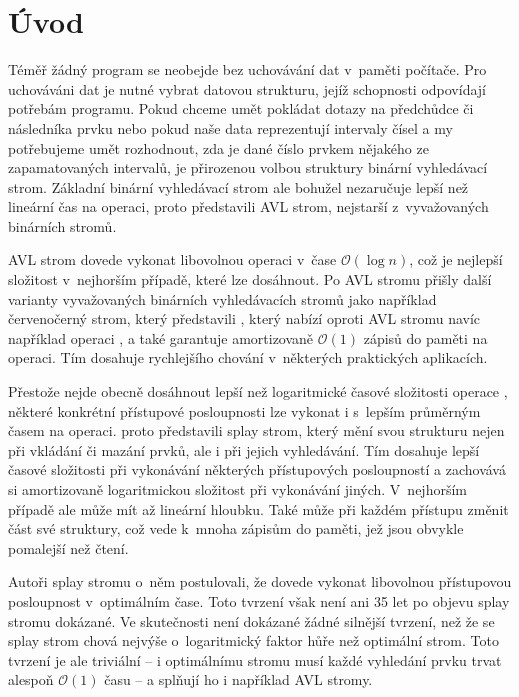 \chapter*{Úvod}

Téměř žádný program se neobejde bez uchovávání dat v~paměti počítače. Pro uchováváni dat je nutné vybrat datovou strukturu, jejíž schopnosti odpovídají potřebám programu. Pokud chceme umět pokládat dotazy na předchůdce či následníka prvku nebo pokud naše data reprezentují intervaly čísel a my potřebujeme umět rozhodnout, zda je dané číslo prvkem nějakého ze zapamatovaných intervalů, je přirozenou volbou struktury binární vyhledávací strom. Základní binární vyhledávací strom ale bohužel nezaručuje lepší než lineární čas na operaci, proto \citet{AVL} představili AVL strom, nejstarší z~vyvažovaných binárních stromů.

AVL strom dovede vykonat libovolnou operaci v~čase $\mathcal O(\log n)$, což je nejlepší složitost v~nejhorším případě, které lze dosáhnout. Po AVL stromu přišly další varianty vyvažovaných binárních vyhledávacích stromů jako například červenočerný strom, který představili \citet{redblack}, který nabízí oproti AVL stromu navíc například operaci , a také garantuje amortizovaně $\mathcal O(1)$ zápisů do paměti na operaci. Tím dosahuje rychlejšího chování v~některých praktických aplikacích. 

Přestože nejde obecně dosáhnout lepší než logaritmické časové složitosti operace , některé konkrétní přístupové posloupnosti lze vykonat i s~lepším průměrným časem na operaci. \citet{splay} proto představili splay strom, který mění svou strukturu nejen při vkládání či mazání prvků, ale i při jejich vyhledávání. Tím dosahuje lepší časové složitosti při vykonávání některých přístupových posloupností a zachovává si amortizovaně logaritmickou složitost při vykonávání jiných. V~nejhorším případě ale může mít až lineární hloubku. Také může při každém přístupu změnit část své struktury, což vede k~mnoha zápisům do paměti, jež jsou obvykle pomalejší než čtení.

Autoři splay stromu o~něm postulovali, že dovede vykonat libovolnou přístupovou posloupnost v~optimálním čase. Toto tvrzení však není ani 35 let po objevu splay stromu dokázané. Ve skutečnosti není dokázané žádné silnější tvrzení, než že se splay strom chová nejvýše o~logaritmický faktor hůře než optimální strom. Toto tvrzení je ale triviální -- i optimálnímu stromu musí každé vyhledání prvku trvat alespoň $\mathcal O(1)$ času -- a splňují ho i například AVL stromy.

